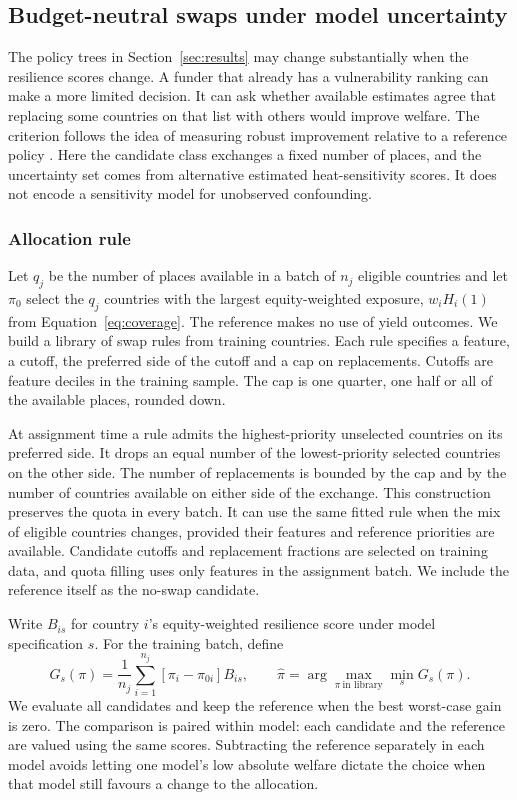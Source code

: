 \subsection{Budget-neutral swaps under model uncertainty}
\label{sec:swaps}

The policy trees in Section~\ref{sec:results} may change substantially when the
resilience scores change. A funder that already has a vulnerability ranking can make a
more limited decision. It can ask whether available estimates agree that replacing
some countries on that list with others would improve welfare. The criterion follows
the idea of measuring robust improvement relative to a reference policy
\citep{kalluszhou2021}. Here the candidate class exchanges a fixed number of places,
and the uncertainty set comes from alternative estimated heat-sensitivity scores.
It does not encode a sensitivity model for unobserved confounding.

\subsubsection{Allocation rule}

Let $q_j$ be the number of places available in a batch of $n_j$ eligible countries
and let $\pi_0$ select the $q_j$ countries with the largest equity-weighted
exposure, $w_iH_i(1)$ from Equation~\eqref{eq:coverage}. The reference makes no use of
yield outcomes. We build a library of swap rules from training countries. Each
rule specifies a feature, a cutoff, the preferred side of the cutoff and a cap
on replacements. Cutoffs are feature deciles in the training sample. The cap is
one quarter, one half or all of the available places, rounded down.

At assignment time a rule admits the highest-priority unselected countries on
its preferred side. It drops an equal number of the lowest-priority selected
countries on the other side. The number of replacements is bounded by the cap
and by the number of countries available on either side of the exchange. This
construction preserves the quota in every batch. It can use the same fitted
rule when the mix of eligible countries changes, provided their features and
reference priorities are available. Candidate cutoffs and replacement fractions
are selected on training data, and quota filling uses only features in the
assignment batch. We include the reference itself as the no-swap candidate.

Write $B_{is}$ for country $i$'s equity-weighted resilience score under model
specification $s$. For the training batch, define
\begin{equation}\label{eq:swap-criterion}
 G_s(\pi) = \frac{1}{n_j}\sum_{i=1}^{n_j}
             [\pi_i-\pi_{0i}] B_{is},
 \qquad
 \hat\pi = \arg\max_{\pi\ \text{in library}} \min_s G_s(\pi).
\end{equation}
We evaluate all candidates and keep the reference when the best worst-case gain
is zero. The comparison is paired within model: each candidate and the reference
are valued using the same scores. Subtracting the reference separately in each
model avoids letting one model's low absolute welfare dictate the choice when
that model still favours a change to the allocation.

